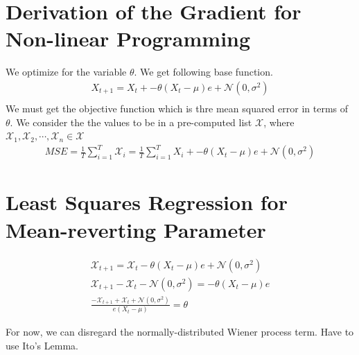 \documentclass{article}
\begin{document}
\begin{spacing}{2.0}
\section{Derivation of the Gradient for Non-linear Programming}

We optimize for the variable $\theta$. We get following base function.
\begin{gather*}
    X_{t + 1} = X_{t} + -\theta(X_{t} - \mu)e + \mathcal{N}(0, \sigma^{2}) \\
\end{gather*}
We must get the objective function which is thre mean squared error in terms of $\theta$.
We consider the the values to be in a pre-computed list $\mathcal{X}$, where $\mathcal{X}_{1}, \mathcal{X}_{2}, \cdots, \mathcal{X}_{n} \in \mathcal{X}$
\begin{gather*}
    MSE = \frac{1}{T} \sum_{i = 1}^{T} \mathcal{X}_{i} = \frac{1}{T} \sum_{i = 1}^{T} X_{i} + -\theta(X_{t} - \mu)e + \mathcal{N}(0, \sigma^{2})
\end{gather*}

\section{Least Squares Regression for Mean-reverting Parameter}
\begin{gather*}
    \mathcal{X}_{t + 1} = \mathcal{X}_{t} - \theta (X_{t} - \mu)e + \mathcal{N}(0, \sigma^{2}) \\
    \mathcal{X}_{t + 1} - \mathcal{X}_{t} - \mathcal{N}(0, \sigma^{2}) = -\theta (X_{t} - \mu)e  \\
    \frac{- \mathcal{X}_{t + 1} + \mathcal{X}_{t} + \mathcal{N}(0, \sigma^{2})}{e(X_{t} - \mu)} = \theta
\end{gather*}

For now, we can disregard the normally-distributed Wiener process term.
Have to use Ito's Lemma.

\end{spacing}
\end{document}
